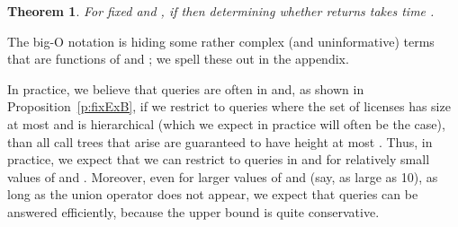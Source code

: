 \documentclass{acmtrans2m}
\newtheorem{theorem}{Theorem}[section]
\newcommand{\thm}{\begin{theorem}}
\newcommand{\ethm}{\end{theorem}}
\newcommand{\<}{
}
\renewcommand{\>}{\rangle}
\begin{document}
\thm\label{t:NPHardAll1}
For fixed  and , if 
then determining whether  returns  takes time
.
\ethm
\noindent The big-O notation is hiding some rather complex (and uninformative) terms that are functions of
 and ; we spell these out in the appendix.

In practice, we believe that queries are often in  and, as shown in Proposition~\ref{p:fixExB}, if
we restrict to queries where the set  of licenses has size at most  and is hierarchical (which we
expect in practice will often be the case), than all call trees that arise are guaranteed to have height
at most .  Thus, in practice, we expect that we can restrict to queries in  and 
for relatively small values of  and .  Moreover, even for larger values of  and  (say, as
large as 10), as long as the union operator does not appear, we expect that queries can be answered
efficiently, because the upper bound is quite conservative.
\end{document}
